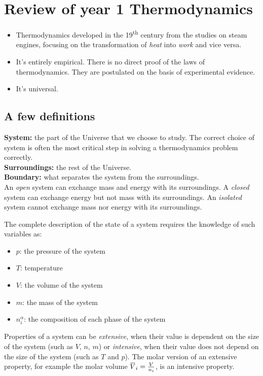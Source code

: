 \documentclass[12pt,a4paper]{report}
\newcommand{\overbar}[1]{\mkern 1.5mu\overline{\mkern-1.5mu#1\mkern-1.5mu}\mkern 1.5mu}
\begin{document}
   \pagestyle{headings}
   \thispagestyle{plain}
   \newpage
   \noindent
   \begin{center}
   \end{center}
   \section*{Review of year 1 Thermodynamics}
   \begin{itemize}
   \item Thermodynamics developed in the 19\textsuperscript{th} century from the studies on steam engines, focusing on the transformation of \textit{heat} into \textit{work} and vice versa.
   \item It's entirely empirical. There is no direct proof of the laws of thermodynamics. They are postulated on the basis of experimental evidence.
   \item It's universal.
   \end{itemize}
   \subsection*{A few definitions}
   \textbf{System:} the part of the Universe that we choose to study. The correct choice of system is often the most critical step in solving a thermodynamics problem correctly.\\ \textbf{Surroundings:} the rest of the Universe.\\ \textbf{Boundary:} what separates the system from the surroundings.\\ An \textit{open} system can exchange mass and energy with its surroundings. A \textit{closed} system can exchange energy but not mass with its surroundings. An \textit{isolated} system cannot exchange mass nor energy with its surroundings. 
   
   The complete description of the state of a system requires the knowledge of such variables as:
   \begin{itemize}
   \item $p$: the pressure of the system
   \item $T$: temperature
   \item $V$: the volume of the system
   \item $m$: the mass of the system
   \item $n^{\alpha}_{i}$: the composition of each phase of the system
   \end{itemize}
   Properties of a system can be \textit{extensive}, when their value is dependent on the size of the system (such as $V$, $n$, $m$) or \textit{intensive}, when their value does not depend on the size of the system (such as $T$ and $p$). The molar version of an extensive property, for example the molar volume $\overbar{V}_{i} = \frac{V}{n_{i}}$, is an intensive property.
   
\end{document}
